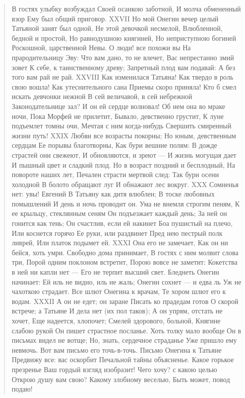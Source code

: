 \begin{verse}
В гостях улыбку возбуждал
Своей осанкою заботной,
И молча обмененный взор
Ему был общий приговор.
XXVII
Но мой Онегин вечер целый
Татьяной занят был одной,
Не этой девочкой несмелой,
Влюбленной, бедной и простой,
Но равнодушною княгиней,
Но неприступною богиней
Роскошной, царственной Невы.
О люди! все похожи вы
На прародительницу Эву:
Что вам дано, то не влечет,
Вас непрестанно змий зовет
К себе, к таинственному древу;
Запретный плод вам подавай:
А без того вам рай не рай.
XXVIII
Как изменилася Татьяна!
Как твердо в роль свою вошла!
Как утеснительного сана
Приемы скоро приняла!
Кто б смел искать девчонки нежной
В сей величавой, в сей небрежной
Законодательнице зал?
И он ей сердце волновал!
Об нем она во мраке ночи,
Пока Морфей не прилетит,
Бывало, девственно грустит,
К луне подъемлет томны очи,
Мечтая с ним когда-нибудь
Свершить смиренный жизни путь!
XXIX
Любви все возрасты покорны;
Но юным, девственным сердцам
Ее порывы благотворны,
Как бури вешние полям:
В дожде страстей они свежеют,
И обновляются, и зреют —
И жизнь могущая дает
И пышный цвет и сладкий плод.
Но в возраст поздний и бесплодный,
На повороте наших лет,
Печален страсти мертвой след:
Так бури осени холодной
В болото обращают луг
И обнажают лес вокруг.
XXX
Сомненья нет: увы! Евгений
В Татьяну как дитя влюблен;
В тоске любовных помышлений
И день и ночь проводит он.
Ума не внемля строгим пеням,
К ее крыльцу, стеклянным сеням
Он подъезжает каждый день;
За ней он гонится как тень;
Он счастлив, если ей накинет
Боа пушистый на плечо,
Или коснется горячо
Ее руки, или раздвинет
Пред нею пестрый полк ливрей,
Или платок подымет ей.
XXXI
Она его не замечает,
Как он ни бейся, хоть умри.
Свободно дома принимает,
В гостях с ним молвит слова три,
Порой одним поклоном встретит,
Порою вовсе не заметит:
Кокетства в ней ни капли нет —
Его не терпит высший свет.
Бледнеть Онегин начинает:
Ей иль не видно, иль не жаль;
Онегин сохнет — и едва ль
Уж не чахоткою страдает.
Все шлют Онегина к врачам,
Те хором шлют его к водам.
XXXII
А он не едет; он заране
Писать ко прадедам готов
О скорой встрече; а Татьяне
И дела нет (их пол таков);
А он упрям, отстать не хочет,
Еще надеется, хлопочет;
Смелей здорового, больной,
Княгине слабою рукой
Он пишет страстное посланье.
Хоть толку мало вообще
Он в письмах видел не вотще;
Но, знать, сердечное страданье
Уже пришло ему невмочь.
Вот вам письмо его точь-в-точь.
Письмо Онегина к Татьяне
Предвижу все: вас оскорбит
Печальной тайны объясненье.
Какое горькое презренье
Ваш гордый взгляд изобразит!
Чего хочу? с какою целью
Открою душу вам свою?
Какому злобному веселью,
Быть может, повод подаю!

\end{verse}
